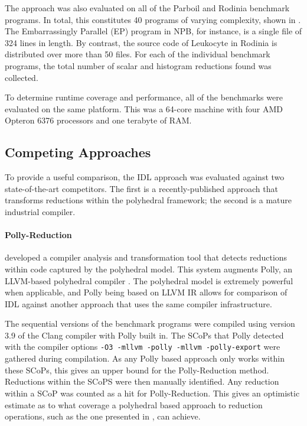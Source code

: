     The approach was also evaluated on all of the Parboil \citep{Stratton2018}
    and Rodinia \citep{Che2009Rodinia} benchmark programs.
    In total, this constitutes 40 programs of varying complexity, shown in
    .
    The Embarrassingly Parallel (EP) program in NPB, for instance, is a single
    file of 324 lines in length.
    By contrast, the source code of Leukocyte in Rodinia is distributed over
    more than 50 files.
    For each of the individual benchmark programs, the total number of scalar
    and histogram reductions found was collected.

    To determine runtime coverage and performance, all of the benchmarks were
    evaluated on the same platform.
    This was a 64-core machine with four AMD Opteron 6376 processors and one
    terabyte of RAM.

\subsection{Competing Approaches}
\label{section:competition}

    To provide a useful comparison, the IDL approach was evaluated against two
    state-of-the-art competitors.
    The first is a recently-published approach that transforms reductions within
    the polyhedral framework; the second is a mature industrial compiler.

\paragraph*{Polly-Reduction}

    \citet{Doerfert2015Polly} developed a compiler analysis and transformation
    tool that detects reductions within code captured by the polyhedral model.
    This system augments Polly, an LLVM-based polyhedral compiler
    \citep{Lengauer2012Polly}.
    The polyhedral model is extremely powerful when applicable, and Polly being
    based on LLVM IR allows for comparison of IDL against another approach that
    uses the same compiler infrastructure.

    The sequential versions of the benchmark programs were compiled using
    version 3.9 of the Clang compiler with Polly built in.
    The SCoPs that Polly detected with the compiler options \texttt{-O3
    -mllvm -polly -mllvm -polly-export} were gathered during compilation.
    As any Polly based approach only works within these SCoPs, this gives an
    upper bound for the Polly-Reduction method.
    Reductions within the SCoPS were then manually identified.
    Any reduction within a SCoP was counted as a hit for Polly-Reduction.
    This gives an optimistic estimate as to what coverage a polyhedral based
    approach to reduction operations, such as the one presented in
    \citet{Doerfert2015Polly}, can achieve.

